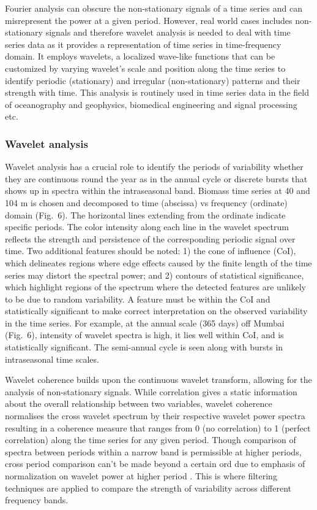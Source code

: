 \documentclass[12pt,a4paper]{article}
\begin{document}
Fourier analysis can obscure the non-stationary signals of a time series and can misrepresent the power at a given period. However, real world cases includes non-stationary signals and therefore wavelet analysis is needed to deal with time series data \citep{torrence1998practical, maraun2004cross} as it provides a representation of time series in time-frequency domain. It employs wavelets, a localized wave-like functions that can be customized by varying wavelet's scale and position along the time series to identify periodic (stationary) and irregular (non-stationary) patterns and their strength with time. This analysis is routinely used in time series data in the field of oceanography and geophysics, biomedical engineering and signal processing etc.

\subsubsection{Wavelet analysis}
\label{sec:wavelet_analysis}
Wavelet analysis has a crucial role to identify the periods of variability whether they are continuous round the year as in the annual cycle or discrete bursts that shows up in spectra within the intraseasonal band. Biomass time series at 40 and 104 m is chosen and decomposed to time (abscissa) vs frequency (ordinate) domain (Fig.~6). The horizontal lines extending from the ordinate indicate specific periods. The color intensity along each line in the wavelet spectrum reflects the strength and persistence of the corresponding periodic signal over time. Two additional features should be noted: 1) the cone of influence (CoI), which delineates regions where edge effects caused by the finite length of the time series may distort the spectral power; and 2) contours of statistical significance, which highlight regions of the spectrum where the detected features are unlikely to be due to random variability. A feature must be within the CoI and statistically significant to make correct interpretation on the observed variability in the time series. For example, at the annual scale (365 days) off Mumbai (Fig.~6), intensity of wavelet spectra is high, it lies well within CoI, and is statistically significant. The semi-annual cycle is seen along with bursts in intraseasonal time scales. 

Wavelet coherence builds upon the continuous wavelet transform, allowing for the analysis of non-stationary signals. While correlation gives a static information about the overall relationship between two variables, wavelet coherence normalises the cross wavelet spectrum by their respective wavelet power spectra resulting in a coherence measure that ranges from 0 (no correlation) to 1 (perfect correlation) along the time series for any given period. Though comparison of spectra between periods within a narrow band is permissible  at higher periods, cross period comparison can't be made beyond a certain ord due to emphasis of normalization on wavelet power at higher period \citep{maraun2004cross}. This is where filtering techniques are applied to compare the strength of variability across different frequency bands.
\end{document}
